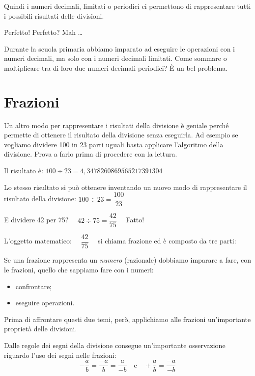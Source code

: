 Quindi i numeri decimali, limitati o periodici ci permettono di 
rappresentare tutti i possibili risultati delle divisioni.

Perfetto! \quad Perfetto? Mah \dots

Durante la scuola primaria abbiamo imparato ad eseguire le operazioni con i 
numeri decimali, ma solo con i numeri decimali limitati. Come 
sommare o moltiplicare tra di loro due numeri decimali periodici? È un bel 
problema.

\newpage

\section{Frazioni}
\label{sec:razionali_frazioni}

Un altro modo per rappresentare i risultati della divisione è geniale 
perché permette di ottenere il risultato della divisione senza eseguirla. 
Ad esempio se vogliamo dividere 100 in 23 parti uguali basta applicare 
l'algoritmo della divisione. Prova a farlo prima di procedere con la 
lettura.

Il risultato è:
\(100 \div 23 = 4,\overline{3478260869565217391304}\)

Lo stesso risultato si può ottenere inventando un nuovo modo di 
rappresentare il risultato della divisione:
\(100 \div 23 = \dfrac{100}{23}\)

E dividere 42 per 75?
\(\quad 42 \div 75 = \dfrac{42}{75} \quad\)
Fatto!

L'oggetto matematico: \(\quad \dfrac{42}{75} \quad\) 
si chiama frazione ed è composto da tre parti:

\begin{center} \frazione \end{center}

Se una frazione rappresenta un \emph{numero} (razionale) dobbiamo imparare 
a fare, con le frazioni, quello che sappiamo fare con i numeri:
\begin{itemize} [nosep]
 \item confrontare;
 \item eseguire operazioni.
\end{itemize}

Prima di affrontare questi due temi, però, applichiamo alle frazioni 
un'importante proprietà delle divisioni.

\begin{osservazione}
 Dalle regole dei segni della divisione consegue un'importante osservazione 
riguardo l'uso dei segni nelle frazioni:
\[-\dfrac{a}{b} = \dfrac{-a}{b} = \dfrac{a}{-b} \quad \text{e} \quad
  +\dfrac{a}{b} = \dfrac{-a}{-b}
\]
\end{osservazione}

